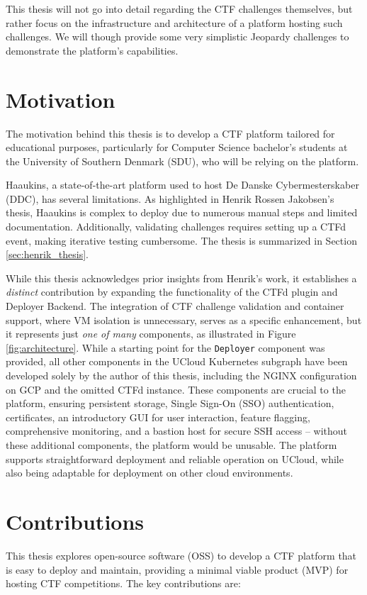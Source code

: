 This thesis will not go into detail regarding the CTF challenges themselves, but rather focus on the infrastructure and architecture of a platform hosting such challenges. We will though provide some very simplistic Jeopardy challenges to demonstrate the platform's capabilities.

\section{Motivation}
The motivation behind this thesis is to develop a CTF platform tailored for educational purposes, particularly for Computer Science bachelor's students at the University of Southern Denmark (SDU), who will be relying on the platform.

Haaukins, a state-of-the-art platform used to host De Danske Cybermesterskaber (DDC), has several limitations. As highlighted in Henrik Rossen Jakobsen's thesis, Haaukins is complex to deploy due to numerous manual steps and limited documentation. Additionally, validating challenges requires setting up a CTFd event, making iterative testing cumbersome. The thesis is summarized in Section \ref{sec:henrik_thesis}.

While this thesis acknowledges prior insights from Henrik's work, it establishes a \textit{distinct} contribution by expanding the functionality of the CTFd plugin and Deployer Backend. The integration of CTF challenge validation and container support, where VM isolation is unnecessary, serves as a specific enhancement, but it represents just \textit{one of many} components, as illustrated in Figure \ref{fig:architecture}. While a starting point for the \texttt{Deployer} component was provided, all other components in the UCloud Kubernetes subgraph have been developed solely by the author of this thesis, including the NGINX configuration on GCP and the omitted CTFd instance. These components are crucial to the platform, ensuring persistent storage, Single Sign-On (SSO) authentication, certificates, an introductory GUI for user interaction, feature flagging, comprehensive monitoring, and a bastion host for secure SSH access -- without these additional components, the platform would be unusable. The platform supports straightforward deployment and reliable operation on UCloud, while also being adaptable for deployment on other cloud environments.

\section{Contributions}
This thesis explores open-source software (OSS) to develop a CTF platform that is easy to deploy and maintain, providing a minimal viable product (MVP) for hosting CTF competitions. The key contributions are:

